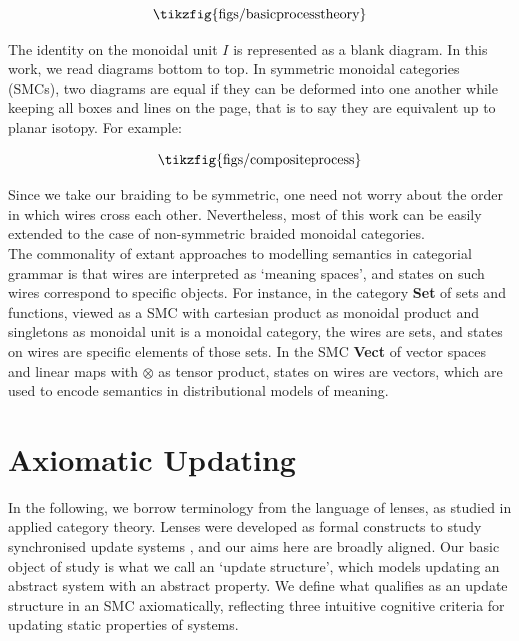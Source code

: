 \documentclass[11pt]{article}
\newcommand{\tikzfigscale}[2]{\scalebox{#1}{\tikzfig{#2}}}
\theoremstyle{definition}
\theoremstyle{plain}
\begin{document}
\begin{equation}\label{basicprocesstheory}
\tikzfigscale{1}{figs/basicprocesstheory}
\end{equation}

The identity on the monoidal unit $I$ is represented as a blank diagram. In this work, we read diagrams bottom to top. In symmetric monoidal categories (SMCs), two diagrams are equal if they can be deformed into one another while keeping all boxes and lines on the page, that is to say they are equivalent up to planar isotopy. For example: 

\begin{equation}
\tikzfigscale{1}{figs/compositeprocess}
\end{equation}

Since we take our braiding to be symmetric, one need not worry about the order in which wires cross each other. Nevertheless, most of this work can be easily extended to the case of non-symmetric braided monoidal categories.\\

The commonality of extant approaches to modelling semantics in categorial grammar is that wires are interpreted as `meaning spaces', and states on such wires correspond to specific objects. For instance, in the category \textbf{Set} of sets and functions, viewed as a SMC with cartesian product as monoidal product and singletons as monoidal unit is a monoidal category, the wires are sets, and states on wires are specific elements of those sets. In the SMC \textbf{Vect} of vector spaces and linear maps with $\otimes$ as tensor product, states on wires are vectors, which are used to encode semantics in distributional models of meaning.

\section{Axiomatic Updating}

In the following, we borrow terminology from the language of lenses, as studied in applied category theory. Lenses were developed as formal constructs \cite{foster_combinators_nodate} to study synchronised update systems \cite{bancilhon_update_1981}, and our aims here are broadly aligned. Our basic object of study is what we call an `update structure', which models updating an abstract system with an abstract property. We define what qualifies as an update structure in an SMC axiomatically, reflecting three intuitive cognitive criteria for updating static properties of systems.
\end{document}

